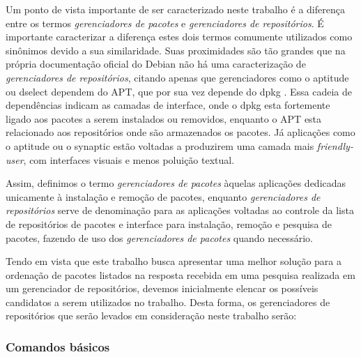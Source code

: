 Um ponto de vista importante de ser caracterizado neste trabalho é a diferença entre os termos \textit{ gerenciadores de pacotes} e \textit{gerenciadores de repositórios}.
É importante caracterizar a diferença estes dois termos comumente utilizados como sinônimos devido a sua similaridade. Suas proximidades são tão grandes que na própria documentação oficial do Debian não há uma caracterização de \textit{gerenciadores de repositórios}, citando apenas que gerenciadores como o {\code aptitude} ou {\code dselect} dependem do {\code APT}, que por sua vez depende do {\code dpkg} \cite{debian-faq}. Essa cadeia de dependências indicam as camadas de interface, onde o {\code dpkg} esta fortemente ligado aos pacotes a serem instalados ou removidos, enquanto o {\code APT} esta relacionado aos repositórios onde são armazenados os pacotes. Já aplicações como o {\code aptitude} ou o {\code synaptic} estão voltadas a produzirem uma camada mais \textit{friendly-user}, com interfaces visuais e menos poluição textual.

Assim, definimos o termo \textit{gerenciadores de pacotes} àquelas aplicações dedicadas unicamente à instalação e remoção de pacotes, enquanto \textit{gerenciadores de repositórios} serve de denominação para as aplicações voltadas ao controle da lista de repositórios de pacotes e interface  para instalação, remoção e pesquisa de pacotes, fazendo de uso dos \textit{gerenciadores de pacotes} quando necessário.

Tendo em vista que este trabalho busca apresentar uma melhor solução para a ordenação de pacotes listados na resposta recebida em uma pesquisa realizada em um gerenciador de repositórios, devemos inicialmente elencar os possíveis candidatos a serem utilizados no trabalho.
Desta forma, os gerenciadores de repositórios que serão levados em consideração neste trabalho serão:







\subsubsection{Comandos básicos} %
\label{subs:comandos_basicos}

